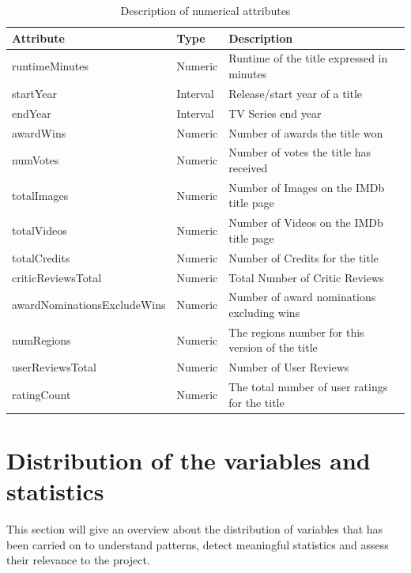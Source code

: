 \begin{table}[h]
    \centering
    \begin{tabular}{|l|l|l|} %
        \hline
        \textbf{Attribute} & \textbf{Type} & \textbf{Description} \\ 
        \hline
        runtimeMinutes & Numeric & Runtime of the title expressed in minutes \\ 
        \hline
        startYear & Interval & Release/start year of a title \\ 
        \hline
        endYear & Interval & TV Series end year \\
        \hline
        awardWins & Numeric & Number of awards the title won \\ 
        \hline
        numVotes & Numeric & Number of votes the title has received \\ 
        \hline
        totalImages & Numeric & Number of Images on the IMDb title page \\ 
        \hline
        totalVideos & Numeric & Number of Videos on the IMDb title page \\ 
        \hline
        totalCredits & Numeric & Number of Credits for the title \\ 
        \hline
        criticReviewsTotal & Numeric & Total Number of Critic Reviews \\ 
        \hline
        awardNominationsExcludeWins & Numeric & Number of award nominations excluding wins \\ 
        \hline
        numRegions & Numeric & The regions number for this version of the title \\ 
        \hline
        userReviewsTotal & Numeric & Number of User Reviews \\ 
        \hline
        ratingCount & Numeric & The total number of user ratings for the title \\ 
        \hline
    \end{tabular}
    \caption{Description of numerical attributes}
    \label{tab:numerical_attributes}
\end{table}
\section{Distribution of the variables and statistics}\label{sec:variable_distrib}
This section will give an overview about the distribution of variables that has been carried on to understand patterns, detect meaningful statistics and assess their relevance to the project. 

